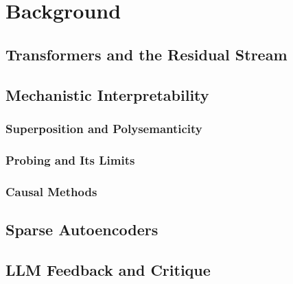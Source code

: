 \chapter{Background}

\section{Transformers and the Residual Stream}

\section{Mechanistic Interpretability}
\subsection{Superposition and Polysemanticity}
\subsection{Probing and Its Limits}
\subsection{Causal Methods}

\section{Sparse Autoencoders}

\section{LLM Feedback and Critique}
